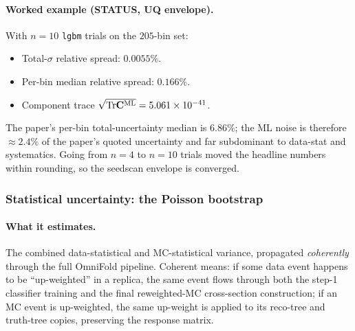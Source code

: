 \paragraph{Worked example (STATUS, UQ envelope).}
With $n=10$ \texttt{lgbm} trials on the $205$-bin set:
\begin{itemize}[nosep]
  \item Total-$\sigma$ relative spread: $\boxed{0.0055\%}$.
  \item Per-bin median relative spread: $\boxed{0.166\%}$.
  \item Component trace $\sqrt{\mathrm{Tr}\mathbf{C}^{\text{ML}}} = 5.061\times10^{-41}$.
\end{itemize}
The paper's per-bin total-uncertainty median is $6.86\%$; the ML
noise is therefore $\approx 2.4\%$ of the paper's quoted uncertainty
and far subdominant to data-stat and systematics. Going from $n=4$ to
$n=10$ trials moved the headline numbers within rounding, so the
seedscan envelope is converged.

\subsubsection{Statistical uncertainty: the Poisson bootstrap}
\label{sec:bootstrap}

\paragraph{What it estimates.}
The combined data-statistical and MC-statistical variance, propagated
\emph{coherently} through the full OmniFold pipeline. Coherent means:
if some data event happens to be ``up-weighted'' in a replica, the
same event flows through both the step-1 classifier training and the
final reweighted-MC cross-section construction; if an MC event is
up-weighted, the same up-weight is applied to its reco-tree and
truth-tree copies, preserving the response matrix.

